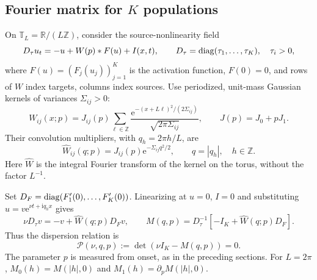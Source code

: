 \documentclass[11pt]{article}
\newcommand{\ii}{\mathrm{i}}
\newcommand{\ee}{\mathrm{e}}
\newcommand{\T}{\mathbb{T}}
\begin{document}
\subsection{Fourier matrix for $K$ populations}
On $\T_L=\mathbb R/(L\mathbb Z)$, consider the source-nonlinearity field
\begin{equation}
 D_\tau u_t=-u+W(p)*F(u)+I(x,t),\qquad
 D_\tau=\operatorname{diag}(\tau_1,\ldots,\tau_K),\quad \tau_i>0,
 \label{eq:population-field}
\end{equation}
where $F(u)=(F_j(u_j))_{j=1}^K$ is the activation function, $F(0)=0$,
and rows of $W$ index targets, columns index sources.
Use periodized, unit-mass Gaussian kernels of variances $\Sigma_{ij}>0$:
\begin{equation}
 W_{ij}(x;p)=J_{ij}(p)\sum_{\ell\in\mathbb Z}
 \frac{\ee^{-(x+L\ell)^2/(2\Sigma_{ij})}}{\sqrt{2\pi\Sigma_{ij}}},
 \qquad J(p)=J_0+pJ_1.
 \label{eq:population-kernels}
\end{equation}
Their convolution multipliers, with $q_h=2\pi h/L$, are
\begin{equation}
 \widehat W_{ij}(q;p)=J_{ij}(p)\ee^{-\Sigma_{ij}q^2/2},
 \qquad q=|q_h|,\quad h\in\mathbb Z.
 \label{eq:population-symbol}
\end{equation}
Here $\widehat W$ is the integral Fourier transform of the kernel on the
torus, without the factor $L^{-1}$.

Set $D_F=\operatorname{diag}(F'_1(0),\ldots,F'_K(0))$. Linearizing at $u=0$, $I=0$
and substituting $u=v\ee^{\nu t+\ii q_hx}$ gives
\begin{equation}
 \nu D_\tau v=-v+\widehat W(q;p)D_Fv,
 \qquad
 \boxed{M(q,p)=D_\tau^{-1}\left[-I_K+\widehat W(q;p)D_F\right].}
 \label{eq:dispersion-matrix}
\end{equation}
Thus the dispersion relation is
\begin{equation}
 \mathcal P(\nu,q,p):=\det(\nu I_K-M(q,p))=0.
 \label{eq:dispersion-polynomial}
\end{equation}
The parameter $p$ is measured from onset, as in the preceding sections.
For $L=2\pi$, $M_0(h)=M(|h|,0)$ and $M_1(h)=\partial_pM(|h|,0)$.

\end{document}
